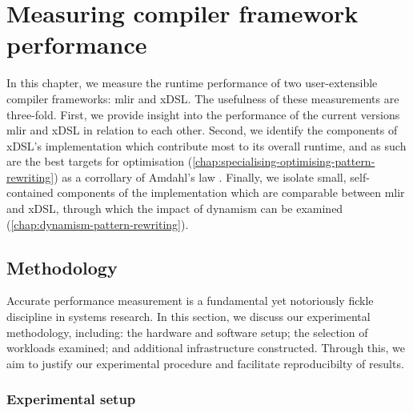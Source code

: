 \chapter{Measuring compiler framework performance}
\label{chap:measuring-compiler-performance}

In this chapter, we measure the runtime performance of two user-extensible compiler frameworks: \ac{mlir} and xDSL.
The usefulness of these measurements are three-fold. First, we provide insight into the performance of the current versions \ac{mlir} and xDSL in relation to each other. %
Second, we identify the components of xDSL's implementation which contribute most to its overall runtime, and as such are the best targets for optimisation (\autoref{chap:specialising-optimising-pattern-rewriting}) as a corrollary of Amdahl's law \cite{amdahlValiditySingleProcessor1967}.
Finally, we isolate small, self-contained components of the implementation which are comparable between \ac{mlir} and xDSL, through which the impact of dynamism can be examined (\autoref{chap:dynamism-pattern-rewriting}).



\section{Methodology}
\label{sec:methodology}

Accurate performance measurement is a fundamental yet notoriously fickle discipline in systems research.
In this section, we discuss our experimental methodology, including: the hardware and software setup; the selection of workloads examined; and additional infrastructure constructed.
Through this, we aim to justify our experimental procedure and facilitate reproducibilty of results.

\subsection{Experimental setup}
\label{ssec:experimental-setup}

